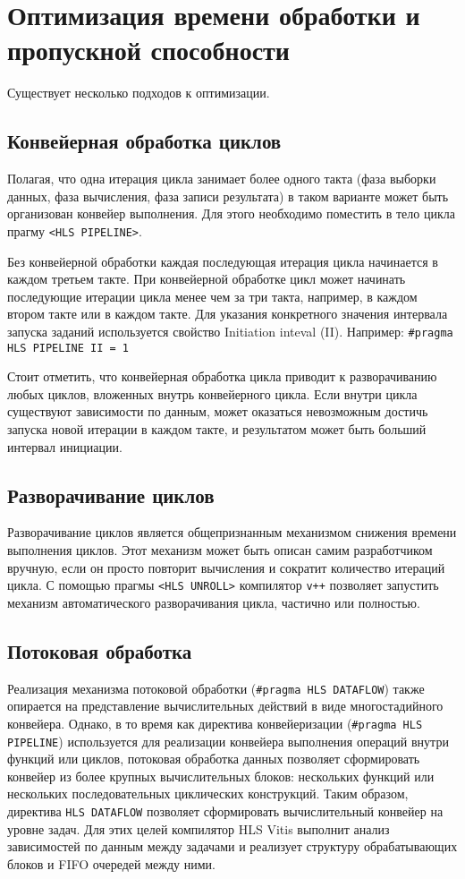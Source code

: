 \section{Оптимизация времени обработки и пропускной способности}

Существует несколько подходов к оптимизации.

\subsection{Конвейерная обработка циклов}

Полагая, что одна итерация цикла занимает более одного такта (фаза выборки
данных, фаза вычисления, фаза записи результата) в таком варианте может быть
организован конвейер выполнения. Для этого необходимо поместить в тело цикла
прагму \texttt{<HLS PIPELINE>}.

Без конвейерной обработки каждая последующая итерация цикла начинается в каждом
третьем такте. При конвейерной обработке цикл может начинать последующие
итерации цикла менее чем за три такта, например, в каждом втором такте или в
каждом такте. Для указания конкретного значения интервала запуска заданий
используется свойство Initiation inteval (II). Например: \texttt{\#pragma HLS
PIPELINE II = 1}

Стоит отметить, что конвейерная обработка цикла приводит к разворачиванию любых
циклов, вложенных внутрь конвейерного цикла. Если внутри цикла существуют
зависимости по данным, может оказаться невозможным достичь запуска новой
итерации в каждом такте, и результатом может быть больший интервал инициации.


\subsection{Разворачивание циклов}

Разворачивание циклов является общепризнанным механизмом снижения времени
выполнения циклов. Этот механизм может быть описан самим разработчиком вручную,
если он просто повторит вычисления и сократит количество итераций цикла. С
помощью прагмы \texttt{<HLS UNROLL>} компилятор \texttt{v++} позволяет
запустить механизм автоматического разворачивания цикла, частично или
полностью.


\subsection{Потоковая обработка}

Реализация механизма потоковой обработки (\texttt{\#pragma HLS DATAFLOW}) также
опирается на представление вычислительных действий в виде многостадийного
конвейера. Однако, в то время как директива конвейеризации (\texttt{\#pragma
HLS PIPELINE}) используется для реализации конвейера выполнения операций внутри
функций или циклов, потоковая обработка данных позволяет сформировать конвейер
из более крупных вычислительных блоков: нескольких функций или нескольких
последовательных циклических конструкций. Таким образом, директива \texttt{HLS
DATAFLOW} позволяет сформировать вычислительный конвейер на уровне задач. Для
этих целей компилятор HLS Vitis выполнит анализ зависимостей по данным между
задачами и реализует структуру обрабатывающих блоков и FIFO очередей между
ними.
